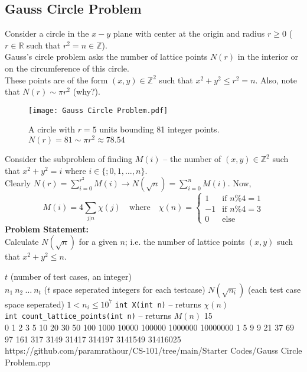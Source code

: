 \subsection{Gauss Circle Problem}\label{pp:gausscircle}
Consider a circle in the $x-y$ plane with center at the origin and radius $r\geq 0$ ($r\in\mathbb{R}$ such that $r^2=n\in\mathbb{Z}$).\\
Gauss's circle problem asks the number of lattice points $N(r)$ in the interior or on the circumference of this circle.\\
These points are of the form $(x,y) \in \mathbb{Z}^2$ such that $x^2+y^2\leq r^2=n$. Also, note that $N(r)\sim\pi r^2$ (why?).
\begin{figure}[H]
\centering
\texttt{[image: Gauss Circle Problem.pdf]}
\caption{A circle with $r=5$ units bounding 81 integer points. $N(r) = 81 \sim\pi r^2\approx78.54$}
\end{figure}
\vspace*{-1em}
Consider the subproblem of finding $M(i)$ -- the number of $(x,y) \in \mathbb{Z}^2$ such that $x^2+y^2=i$ where $i\in\{;0,1,\ldots,n\}.$ %
\\Clearly $\displaystyle N(r)=\sum_{i=0}^{r^2} M(i) \rightarrow N(\sqrt{n})=\sum_{i=0}^{n} M(i)$. Now,\vspace*{-1em}
\begin{equation}
	M(i) = 4\sum_{j|n}\chi(j)\quad\text{where}\quad\chi(n)=\begin{cases} 
      1 & \text{if $n\%4=1$}\\
      -1 & \text{if $n\%4=3$}\\
      0 & \text{else}
   \end{cases}
\end{equation}
\textbf{Problem Statement:}\\
Calculate $N(\sqrt{n})$ for a given $n$; i.e. the number of lattice points $(x,y)$ such that $x^2+y^2\leq n$.
\begin{testcasesFunction}
	{$t$ \hfill(number of test cases, an integer)\\
	$n_1\ n_2\ \ldots\ n_t$ \hfill($t$ space seperated integers for each testcase)}
	{$N(\sqrt{n_i})$ \hfill(each test case space seperated)}
	{$1 < n_i \leq 10^{7}$}
	{\texttt{int X(int n)} -- returns $\chi(n)$\\
	\texttt{int count\_lattice\_points(int n)} -- returns $M(n)$}
	{15\\0 1 2 3 5 10 20 30 50 100 1000 10000 100000 1000000 10000000}
	{1 5 9 9 21 37 69 97 161 317 3149 31417 314197 3141549 31416025}
	{https://github.com/paramrathour/CS-101/tree/main/Starter Codes/Gauss Circle Problem.cpp}
\end{testcasesFunction}
